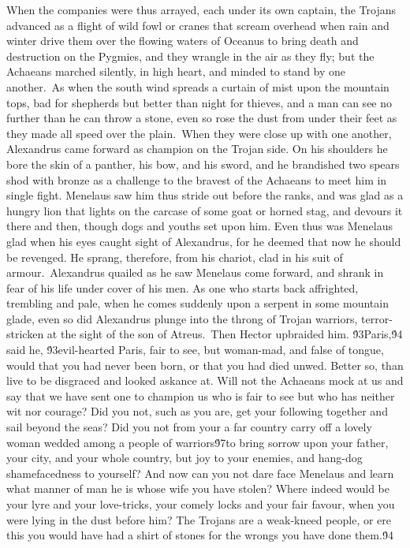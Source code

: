 {  When the companies were thus arrayed, each under its own captain, the Trojans advanced as a flight of wild fowl or cranes that scream overhead when rain and winter drive them over the flowing waters of Oceanus to bring death and destruction on the Pygmies, and they wrangle in the air as they fly; but the Achaeans marched silently, in high heart, and minded to stand by one another.\
As when the south wind spreads a curtain of mist upon the mountain tops, bad for shepherds but better than night for thieves, and a man can see no further than he can throw a stone, even so rose the dust from under their feet as they made all speed over the plain.\
When they were close up with one another, Alexandrus came forward as champion on the Trojan side. On his shoulders he bore the skin of a panther, his bow, and his sword, and he brandished two spears shod with bronze as a challenge to the bravest of the Achaeans to meet him in single fight. Menelaus saw him thus stride out before the ranks, and was glad as a hungry lion that lights on the carcase of some goat or horned stag, and devours it there and then, though dogs and youths set upon him. Even thus was Menelaus glad when his eyes caught sight of Alexandrus, for he deemed that now he should be revenged. He sprang, therefore, from his chariot, clad in his suit of armour.\
Alexandrus quailed as he saw Menelaus come forward, and shrank in fear of his life under cover of his men. As one who starts back affrighted, trembling and pale, when he comes suddenly upon a serpent in some mountain glade, even so did Alexandrus plunge into the throng of Trojan warriors, terror-stricken at the sight of the son of Atreus.\
Then Hector upbraided him. \'93Paris,\'94 said he, \'93evil-hearted Paris, fair to see, but woman-mad, and false of tongue, would that you had never been born, or that you had died unwed. Better so, than live to be disgraced and looked askance at. Will not the Achaeans mock at us and say that we have sent one to champion us who is fair to see but who has neither wit nor courage? Did you not, such as you are, get your following together and sail beyond the seas? Did you not from your a far country carry off a lovely woman wedded among a people of warriors\'97to bring sorrow upon your father, your city, and your whole country, but joy to your enemies, and hang-dog shamefacedness to yourself? And now can you not dare face Menelaus and learn what manner of man he is whose wife you have stolen? Where indeed would be your lyre and your love-tricks, your comely locks and your fair favour, when you were lying in the dust before him? The Trojans are a weak-kneed people, or ere this you would have had a shirt of stones for the wrongs you have done them.\'94\
}
